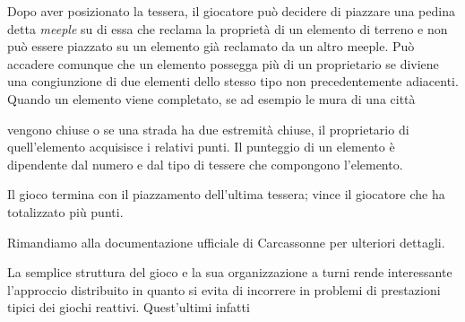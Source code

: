 Dopo aver posizionato la tessera, il giocatore può decidere di piazzare
una pedina detta \emph{meeple} su di essa che reclama la proprietà di un elemento di terreno
 e non può essere piazzato su un elemento già reclamato da un altro
meeple. Può accadere comunque che un elemento possegga più di un
proprietario se diviene una congiunzione di due elementi dello stesso
tipo non precedentemente adiacenti.
Quando un elemento viene completato, se ad esempio le mura di una città

vengono chiuse o se una strada ha due estremità chiuse, il proprietario
di quell'elemento acquisisce i relativi punti. Il punteggio di un
elemento è dipendente dal numero e dal tipo di tessere che compongono
l'elemento.

Il gioco termina con il piazzamento dell'ultima tessera; vince il giocatore che ha totalizzato più punti.

Rimandiamo alla documentazione ufficiale di Carcassonne per ulteriori
dettagli.

La semplice struttura del gioco e la sua organizzazione a turni rende
interessante l'approccio distribuito in quanto si evita di incorrere in problemi 
di prestazioni tipici dei giochi reattivi. Quest'ultimi infatti %

